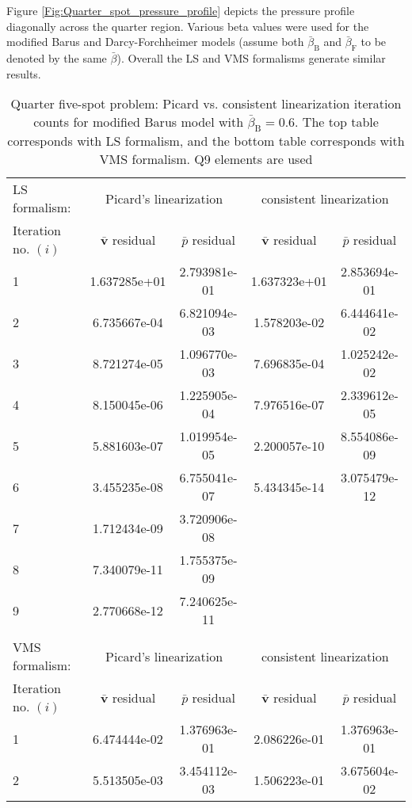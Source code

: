 \documentclass[11pt,reqno]{amsart}
\begin{document}
Figure \ref{Fig:Quarter_spot_pressure_profile} depicts the pressure profile diagonally across 
the quarter region. Various beta values were used for the modified Barus and Darcy-Forchheimer 
models (assume both $\bar{\beta}_{\mathrm{B}}$ and $\bar{\beta}_{\mathrm{F}}$ to be denoted by 
the same $\bar{\beta}$). Overall the LS and VMS formalisms generate similar results.
\begin{table}[t!]
  \centering
  \caption{Quarter five-spot problem: Picard vs. consistent linearization iteration counts for modified Barus model with $\bar{\beta}_{\mathrm{B}} = 0.6$. The top
  table corresponds with LS formalism, and the bottom table corresponds with VMS formalism. Q9 elements are used}
  \begin{tabular}{lcc|cc}
      \hline
      LS formalism:&\multicolumn{2}{c|}{Picard's linearization}&\multicolumn{2}{c}{consistent linearization}\\
      Iteration no. $(i)$&$\mathbf{\bar{v}}$ residual&$\bar{p}$ residual&$\mathbf{\bar{v}}$ residual&$\bar{p}$ residual\\   
      \hline
      1 & 1.637285e+01 & 2.793981e-01 & 1.637323e+01 & 2.853694e-01 \\
      2 & 6.735667e-04 & 6.821094e-03 & 1.578203e-02 & 6.444641e-02 \\
      3 & 8.721274e-05 & 1.096770e-03 & 7.696835e-04 & 1.025242e-02 \\
      4 & 8.150045e-06 & 1.225905e-04 & 7.976516e-07 & 2.339612e-05 \\
      5 & 5.881603e-07 & 1.019954e-05 & 2.200057e-10 & 8.554086e-09 \\
      6 & 3.455235e-08 & 6.755041e-07 & 5.434345e-14 & 3.075479e-12 \\
      7 & 1.712434e-09 & 3.720906e-08 & & \\
      8 & 7.340079e-11 & 1.755375e-09 & & \\
      9 & 2.770668e-12 & 7.240625e-11 & & \\
      \\
       \hline
      VMS formalism:&\multicolumn{2}{c|}{Picard's linearization}&\multicolumn{2}{c}{consistent linearization}\\
      Iteration no. $(i)$&$\mathbf{\bar{v}}$ residual&$\bar{p}$ residual&$\mathbf{\bar{v}}$ residual&$\bar{p}$ residual\\   
      \hline
      1 & 6.474444e-02 & 1.376963e-01 & 2.086226e-01 & 1.376963e-01 \\
      2 & 5.513505e-03 & 3.454112e-03 & 1.506223e-01 & 3.675604e-02 \\

\end{tabular}
\end{table}
\end{document}
